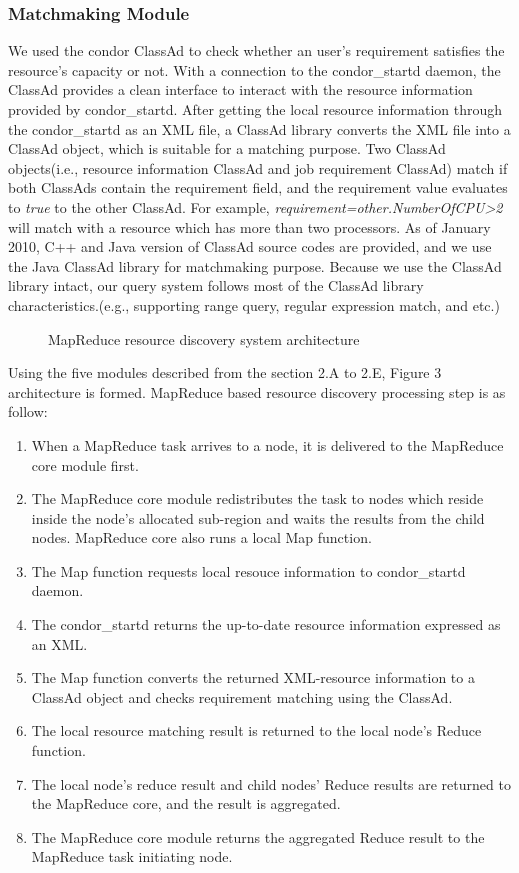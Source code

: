 \documentclass{acm_proc_article-sp}
\begin{document}
\subsubsection{Matchmaking Module}
We used the condor ClassAd\cite{classad} to check whether an user's requirement satisfies the resource's capacity or not. 
With a connection to the condor\_startd daemon, the ClassAd provides a clean interface to interact with the resource information provided by condor\_startd. 
After getting the local resource information through the condor\_startd as an XML file, a ClassAd library converts the XML file into a ClassAd object, which is suitable for a matching purpose.
Two ClassAd objects(i.e., resource information ClassAd and job requirement ClassAd) match if both ClassAds contain the requirement field, and the requirement value evaluates to \textit{true} to the other ClassAd. 
For example, \textit{requirement=other.NumberOfCPU>2} will match with a resource which has more than two processors.
As of January 2010, C++ and Java version of ClassAd source codes are provided, and we use the Java ClassAd library for matchmaking purpose. 
Because we use the ClassAd library intact, our query system follows most of the ClassAd library characteristics.(e.g., supporting range query, regular expression match, and etc.)
\begin{figure}
\centering
{}
\caption{MapReduce resource discovery system architecture}
\end{figure}

Using the five modules described from the section 2.A to 2.E, Figure 3 architecture is formed. MapReduce based resource discovery processing step is as follow:
\begin{enumerate}
\setlength{\itemsep}{0pt}
\setlength{\parskip}{0pt}
\item When a MapReduce task arrives to a node, it is delivered to the MapReduce core module first.
\item The MapReduce core module redistributes the task to nodes which reside inside the node's allocated sub-region and waits the results from the child nodes. MapReduce core also runs a local Map function.
\item The Map function requests local resouce information to condor\_startd daemon.
\item The condor\_startd returns the up-to-date resource information expressed as an XML.
\item The Map function converts the returned XML-resource information to a ClassAd object and checks requirement matching using the ClassAd.
\item The local resource matching result is returned to the local node's Reduce function.
\item The local node's reduce result and child nodes' Reduce results are returned to the MapReduce core, and the result is aggregated.
\item The MapReduce core module returns the aggregated Reduce result to the MapReduce task initiating node.
\end{enumerate}
\end{document}
